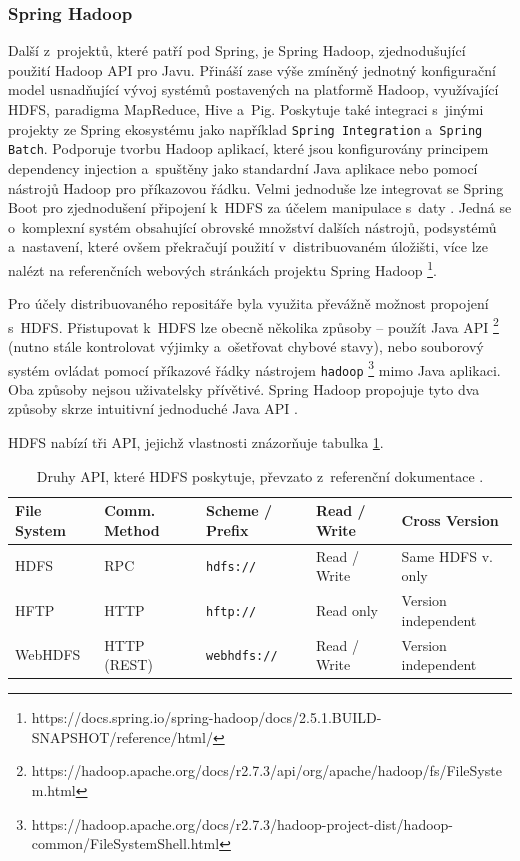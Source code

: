 \subsubsection{Spring Hadoop}
Další z~projektů, které patří pod Spring, je Spring Hadoop, zjednodušující použití Hadoop API pro Javu. Přináší zase výše zmíněný jednotný konfigurační model usnadňující vývoj systémů postavených na platformě Hadoop, využívající HDFS, paradigma MapReduce, Hive a~Pig. Poskytuje také integraci s~jinými projekty ze Spring ekosystému jako například \texttt{Spring Integration} a~\texttt{Spring Batch}. Podporuje tvorbu Hadoop aplikací, které jsou konfigurovány principem dependency injection a~spuštěny jako standardní Java aplikace nebo pomocí nástrojů Hadoop pro příkazovou řádku.
Velmi jednoduše lze integrovat se Spring Boot pro zjednodušení připojení k~HDFS za účelem manipulace s~daty \cite{springHadoop}. Jedná se o~komplexní systém obsahující obrovské množství dalších nástrojů, podsystémů a~nastavení, které ovšem překračují použití v~distribuovaném úložišti, více lze nalézt na referenčních webových stránkách projektu Spring Hadoop \footnote{https://docs.spring.io/spring-hadoop/docs/2.5.1.BUILD-SNAPSHOT/reference/html/}.

Pro účely distribuovaného repositáře byla využita převážně možnost propojení s~HDFS. Přistupovat k~HDFS lze obecně několika způsoby -- použít Java API \footnote{https://hadoop.apache.org/docs/r2.7.3/api/org/apache/hadoop/fs/FileSystem.html} (nutno stále kontrolovat výjimky a~ošetřovat chybové stavy), nebo souborový systém ovládat pomocí příkazové řádky nástrojem \texttt{hadoop} \footnote{https://hadoop.apache.org/docs/r2.7.3/hadoop-project-dist/hadoop-common/FileSystemShell.html} mimo Java aplikaci. Oba způsoby nejsou uživatelsky přívětivé. Spring Hadoop propojuje tyto dva způsoby skrze intuitivní jednoduché Java API \cite{springHadoopReference}.

HDFS nabízí tři API, jejichž vlastnosti znázorňuje tabulka \ref{HDFSApi}.
\begin{table}[h!]
    \centering
    \begin{tabular}{| l | l | l | l | l |}
    \hline
    File System   &   Comm. Method   &   Scheme / Prefix &  Read / Write &   Cross Version \\ \hline
    HDFS & RPC & \texttt{hdfs://} & Read / Write & Same HDFS v. only \\ \hline
    HFTP & HTTP & \texttt{hftp://} & Read only & Version independent \\ \hline
    WebHDFS & HTTP (REST) & \texttt{webhdfs://} & Read / Write & Version independent \\ \hline
    \end{tabular}\par
    \bigskip
    \caption{Druhy API, které HDFS poskytuje, převzato z~referenční dokumentace \cite{springHadoopReference}.}
    \label{HDFSApi}
\end{table}

